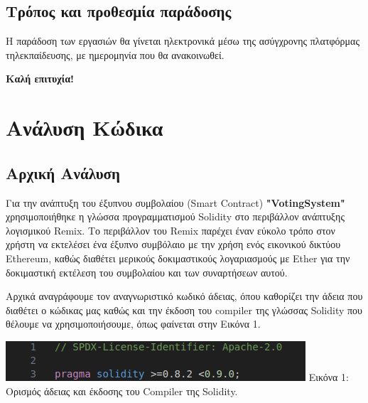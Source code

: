 \documentclass[12pt]{article}
\begin{document}
        \subsection*{Τρόπος και προθεσμία παράδοσης}
        Η παράδοση των εργασιών θα γίνεται ηλεκτρονικά μέσω της ασύγχρονης πλατφόρμας τηλεκπαίδευσης, με ημερομηνία που θα ανακοινωθεί.

    \textbf{Καλή επιτυχία!}

\newpage

\section{Ανάλυση Κώδικα}
    \subsection{Αρχική Ανάλυση}
        Για την ανάπτυξη του έξυπνου συμβολαίου (Smart Contract) \textbf{"VotingSystem"} χρησιμοποιήθηκε η γλώσσα προγραμματισμού Solidity στο περιβάλλον ανάπτυξης λογισμικού Remix. Το περιβάλλον του Remix παρέχει έναν εύκολο τρόπο στον χρήστη να εκτελέσει ένα έξυπνο συμβόλαιο με την χρήση ενός εικονικού δικτύου Ethereum, καθώς διαθέτει μερικούς δοκιμαστικούς λογαριασμούς με Ether για την δοκιμαστική εκτέλεση του συμβολαίου και των συναρτήσεων αυτού.
    
    \vspace{5mm}
    Αρχικά αναγράφουμε τον αναγνωριστικό κωδικό άδειας, όπου καθορίζει την άδεια που διαθέτει ο κώδικας μας καθώς και την έκδοση του compiler της γλώσσας Solidity που θέλουμε να χρησιμοποιήσουμε, όπως φαίνεται στην Εικόνα 1.
    
    \begin{center}
        \includegraphics[width=\linewidth, keepaspectratio]{images/code_license_solidity_v.png}
        Εικόνα 1: Ορισμός άδειας και έκδοσης του Compiler της Solidity.
    \end{center}    
    
\end{document}
